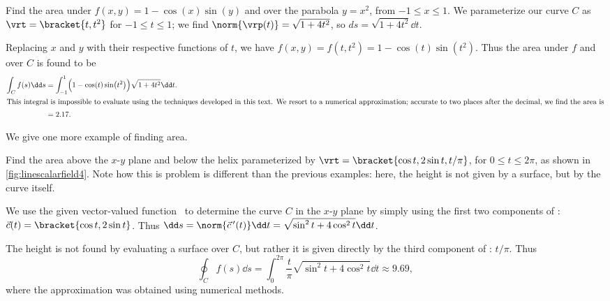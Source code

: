 \begin{example}\label{ex_linescalarfield5}
Find the area under $f(x,y) = 1-\cos(x)\sin(y)$ and over the parabola $y = x^2$, from $-1\leq x\leq 1$.
\solution
We parameterize our curve $C$ as $\vrt =\bracket{t,t^2}$ for $-1\leq t\leq 1$; we find $\norm{\vrp(t)} = \sqrt{1+4t^2}$, so $ds = \sqrt{1+4t^2}\dd t$. 

Replacing $x$ and $y$ with their respective functions of $t$, we have $f(x,y) = f(t,t^2) = 1-\cos(t)\sin(t^2)$. Thus the area under $f$ and over $C$ is found to be
\begin{align*}
	\int_C f(s)\dd s
	&= \int_{-1}^1 \Bigl(1-\cos(t)\sin\bigl(t^2\bigr)\Bigr)\sqrt{1+4t^2}\dd t.\\
\intertext{This integral is impossible to evaluate using the techniques developed in this text. We resort to a numerical approximation; accurate to two places after the decimal, we find the area is}
	&= 2.17.
\end{align*}
\end{example}

We give one more example of finding area.

\begin{example}\label{ex_linescalarfield4}
Find
%
%
the area above the $x$-$y$ plane and below the helix parameterized by $\vrt =\bracket{\cos t,2\sin t,t/\pi}$, for $0\leq t\leq 2\pi$, as shown in \autoref{fig:linescalarfield4}.
\solution
Note how this is problem is different than the previous examples: here, the height is not given by a surface, but by the curve itself. 

We use the given vector-valued function \vrt\ to determine the curve $C$ in the $x$-$y$ plane by simply using the first two components of \vrt: $\vec c(t) =\bracket{\cos t,2\sin t}$. Thus $\dd s = \norm{\vec c\,'(t)}\dd t = \sqrt{\sin^2t + 4\cos^2t}\dd t$. 

The height is not found by evaluating a surface over $C$, but rather it is given directly by the third component of \vrt: $t/\pi$. Thus
\[
\oint_C f(s)\dd s
= \int_0^{2\pi} \frac{t}{\pi}\sqrt{\sin^2t + 4\cos^2t}\dd t \approx 9.69,
\]
where the approximation was obtained using numerical methods.
\end{example}

